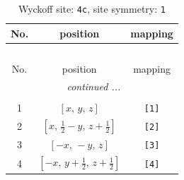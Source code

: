 \documentclass[fleqn,8pt]{jsarticle}
\begin{document}
\renewcommand{\arraystretch}{1.2}
\begin{longtable}{ccc}
\caption{Wyckoff site: {\tt 4c}, site symmetry: {\tt 1}}
 \\
 \hline \hline
No. & position & mapping \\ \hline \endfirsthead

\multicolumn{2}{l}{\tablename\ \thetable{}} \\
 \hline \hline
No. & position & mapping \\ \hline \endhead

 \hline \hline
\multicolumn{2}{r}{\footnotesize\it continued ...} \\ \endfoot

 \hline \hline
\multicolumn{2}{r}{} \\ \endlastfoot

1 & $\left[ x,\, y,\, z \right]$ & {\tt [1]} \\ \hline
2 & $\left[ x,\, \frac{1}{2} - y,\, z + \frac{1}{2} \right]$ & {\tt [2]} \\ \hline
3 & $\left[ - x,\, - y,\, z \right]$ & {\tt [3]} \\ \hline
4 & $\left[ - x,\, y + \frac{1}{2},\, z + \frac{1}{2} \right]$ & {\tt [4]} \\
\end{longtable}
\end{document}
